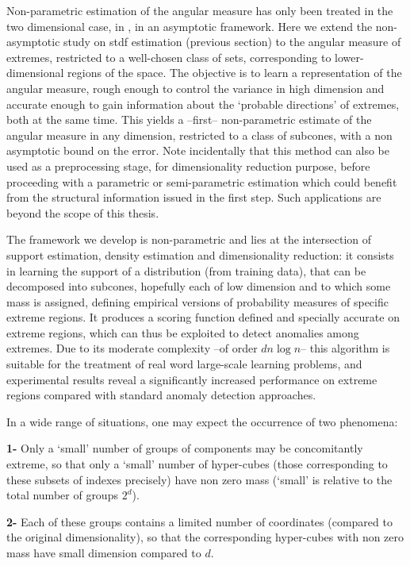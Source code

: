 Non-parametric estimation of the angular measure has only been treated in the two dimensional case, in \cite{Einmahl2001, Einmahl2009}, in an asymptotic framework. Here we extend the non-asymptotic study on {\sc stdf} estimation (previous section) to the angular measure of extremes, restricted to a well-chosen class of sets, corresponding to lower-dimensional regions of the space. The objective is to learn a representation of the angular measure, rough enough to control the variance in high dimension and accurate enough to gain information about the `probable directions' of extremes, both at the same time. This yields a --first-- non-parametric estimate of the angular measure in any dimension, restricted to a class of subcones, %
with a non asymptotic bound on the error. 
Note incidentally that this method can also be used as a preprocessing stage, for dimensionality reduction purpose, before proceeding with a parametric or semi-parametric estimation which could benefit from the structural information issued in the first step. Such applications are beyond the scope of this thesis.

The framework we develop is non-parametric and lies at the intersection of support estimation, density estimation and dimensionality reduction: it consists in learning the support of a distribution (from training data), that can be decomposed into subcones, hopefully each of low dimension and to which some mass is assigned, defining empirical versions of probability measures of specific extreme regions. 
It produces a scoring function defined and specially accurate on extreme regions, which can thus be exploited to detect anomalies among extremes.
Due to its moderate complexity --of order $d n \log n$-- this algorithm is suitable for the treatment of real word large-scale learning problems, and experimental results reveal a significantly increased performance on extreme regions compared with standard anomaly detection approaches. 



In a wide range of situations, one may expect the occurrence of two phenomena:

\textbf{1-} Only a `small' number of groups of components may be concomitantly extreme, so that only a `small' number of hyper-cubes (those corresponding to these subsets of indexes precisely) have non zero mass (`small' is relative to the total number of groups $2^d$).

\textbf{2-} Each of these groups contains a limited number of coordinates (compared to the original dimensionality), so that the corresponding hyper-cubes with non zero mass have small dimension compared to $d$.

